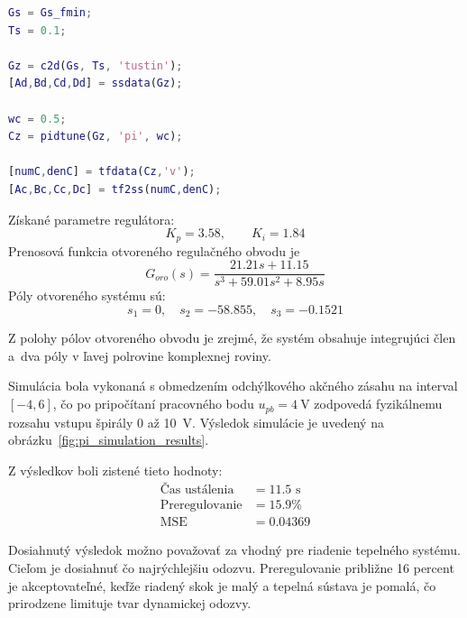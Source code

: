 \begin{lstlisting}[language=Matlab,
caption={Diskretizácia modelu a ladenie PI regulátora pomocou \texttt{pidtune()}},
label={lst:pi_pidtune}]
Gs = Gs_fmin;
Ts = 0.1;

Gz = c2d(Gs, Ts, 'tustin');
[Ad,Bd,Cd,Dd] = ssdata(Gz);

wc = 0.5;
Cz = pidtune(Gz, 'pi', wc);

[numC,denC] = tfdata(Cz,'v');
[Ac,Bc,Cc,Dc] = tf2ss(numC,denC);
\end{lstlisting}
Získané parametre regulátora:
\begin{equation}
	K_p = 3.58, \qquad K_i = 1.84
	\label{eq:pi_gains}
\end{equation}
Prenosová funkcia otvoreného regulačného obvodu je
\begin{equation}
	G_{oro}(s) =
	\frac{21.21 s + 11.15}{s^3 + 59.01 s^2 + 8.95 s}
	\label{eq:oro_tf}
\end{equation}
Póly otvoreného systému sú:
\begin{equation}
	s_{1} = 0, \quad s_{2} = -58.855, \quad s_{3} = -0.1521
	\label{eq:oro_poles}
\end{equation}

Z polohy pólov otvoreného obvodu je zrejmé, že systém obsahuje integrujúci člen
a~dva póly v ľavej polrovine komplexnej roviny.

Simulácia bola vykonaná s obmedzením odchýlkového akčného zásahu na interval
\([-4, 6]\), čo po pripočítaní pracovného bodu \(u_{pb}=4~\mathrm{V}\)
zodpovedá fyzikálnemu rozsahu vstupu špirály 0 až 10~V. 
Výsledok simulácie je uvedený na obrázku~\ref{fig:pi_simulation_results}.


Z výsledkov boli zistené tieto hodnoty:
\begin{align}
	\text{Čas ustálenia} &= 11.5 \text{ s}
	\label{eq:settling_time} \\
	\text{Preregulovanie} &= 15.9 \%
	\label{eq:overshoot} \\
	\text{MSE} &= 0.04369
	\label{eq:mse_pi}
\end{align}

Dosiahnutý výsledok možno považovať za vhodný pre riadenie tepelného systému.  
Cieľom je dosiahnuť čo najrýchlejšiu odozvu.  
Preregulovanie približne 16 percent je akceptovateľné, keďže riadený skok je malý a tepelná sústava je pomalá, čo prirodzene limituje tvar dynamickej odozvy.


